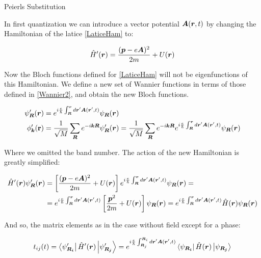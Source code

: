 \begin{subappendices}
\begin{section}{Peierls Substitution}
\label{AP3A}

In first quantization we can introduce a vector potential $\boldsymbol{A}(\boldsymbol{r},t)$ by changing the Hamiltonian of the latice \ref{LaticeHam} to:

\begin{equation}
\label{HamEMF}
  \hat{H}'(\boldsymbol{r}) = \frac{(\boldsymbol{p}-e\boldsymbol{A})^2}{2m} +U(\boldsymbol{r})
\end{equation}

Now the Bloch functions defined for \ref{LaticeHam} will not be eigenfunctions of this Hamiltonian. We define a new set of Wannier functions in terms of those defined in \ref{Wannier2}, and obtain the new Bloch functions. 

\begin{align}
\psi'_{\boldsymbol{R}}(\boldsymbol{r}) &= e^{i\frac{e}{\hbar}\int_{\boldsymbol{R}}^{\boldsymbol{r}} d\boldsymbol{r}'\boldsymbol{A}(\boldsymbol{r}',t)} \psi_{\boldsymbol{R}}(\boldsymbol{r}) \\
\phi'_{\boldsymbol{k}}(\textbf{r}) &= \frac{1}{\sqrt{M}}\sum_{\boldsymbol{R}} e^{-i\boldsymbol{k}\boldsymbol{R}}\psi'_{\boldsymbol{R}}(\boldsymbol{r}) = \frac{1}{\sqrt{M}}\sum_{\boldsymbol{R}} e^{-i\boldsymbol{k}\boldsymbol{R}} e^{i\frac{e}{\hbar}\int_{\boldsymbol{R}}^{\boldsymbol{r}} d\boldsymbol{r}'\boldsymbol{A}(\boldsymbol{r}',t)} \psi_{\boldsymbol{R}}(\boldsymbol{r})
\end{align}

Where we omitted the band number. The action of the new Hamiltonian is greatly simplified:

\begin{align*}
\hat{H}'(\boldsymbol{r}) \psi'_{\boldsymbol{R}} (\boldsymbol{r}) &= \left[ \frac{(\boldsymbol{p}-e\boldsymbol{A})^2}{2m} +U(\boldsymbol{r}) \right] e^{i\frac{e}{\hbar}\int_{\boldsymbol{R}}^{\boldsymbol{r}} d\boldsymbol{r}'\boldsymbol{A}(\boldsymbol{r}',t)} \psi_{\boldsymbol{R}}(\boldsymbol{r}) = \\
&= e^{i\frac{e}{\hbar}\int_{\boldsymbol{R}}^{\boldsymbol{r}} d\boldsymbol{r}'\boldsymbol{A}(\boldsymbol{r}',t)} \left[ \frac{\boldsymbol{p}^2}{2m} + U(\boldsymbol{r}) \right] \psi_{\boldsymbol{R}}(\boldsymbol{r}) = e^{i\frac{e}{\hbar}\int_{\boldsymbol{R}}^{\boldsymbol{r}} d\boldsymbol{r}'\boldsymbol{A}(\boldsymbol{r}',t)} \hat{H}(\boldsymbol{r}) \psi_{\boldsymbol{R}}(\boldsymbol{r})
\end{align*}

And so, the matrix elements as in the case without field except for a phase:

\begin{equation}
\label{PeierlsMtxElem}
t_{ij}(t) = \bra{\psi'_{\boldsymbol{R_i}}} \hat{H}'(\boldsymbol{r}) \ket{\psi'_{\boldsymbol{R_j}}} = e^{i\frac{e}{\hbar}\int_{\boldsymbol{R}_j}^{\boldsymbol{R}_i} d\boldsymbol{r}'\boldsymbol{A}(\boldsymbol{r}',t)} \bra{\psi_{\boldsymbol{R_i}}} \hat{H}(\boldsymbol{r}) \ket{\psi_{\boldsymbol{R_j}}}
\end{equation}


\end{section}
\end{subappendices}
